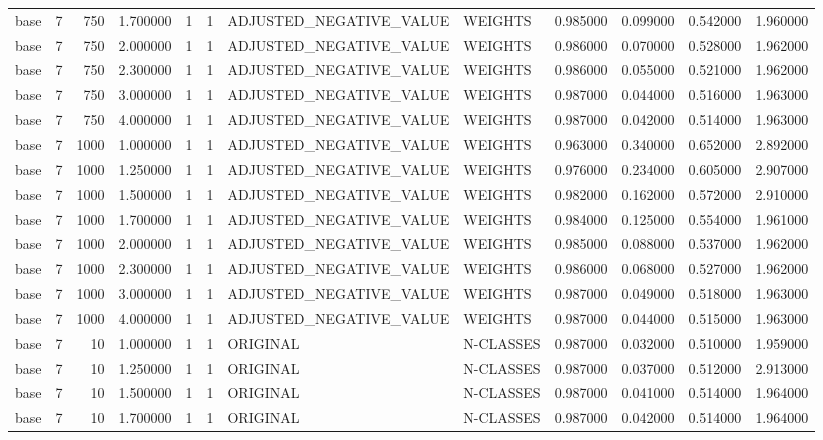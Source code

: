 \begin{tabular}{lrrrllllrrrr}
base & 7 & 750 & 1.700000 & 1 & 1 & ADJUSTED_NEGATIVE_VALUE & WEIGHTS & 0.985000 & 0.099000 & 0.542000 & 1.960000 \\
base & 7 & 750 & 2.000000 & 1 & 1 & ADJUSTED_NEGATIVE_VALUE & WEIGHTS & 0.986000 & 0.070000 & 0.528000 & 1.962000 \\
base & 7 & 750 & 2.300000 & 1 & 1 & ADJUSTED_NEGATIVE_VALUE & WEIGHTS & 0.986000 & 0.055000 & 0.521000 & 1.962000 \\
base & 7 & 750 & 3.000000 & 1 & 1 & ADJUSTED_NEGATIVE_VALUE & WEIGHTS & 0.987000 & 0.044000 & 0.516000 & 1.963000 \\
base & 7 & 750 & 4.000000 & 1 & 1 & ADJUSTED_NEGATIVE_VALUE & WEIGHTS & 0.987000 & 0.042000 & 0.514000 & 1.963000 \\
base & 7 & 1000 & 1.000000 & 1 & 1 & ADJUSTED_NEGATIVE_VALUE & WEIGHTS & 0.963000 & 0.340000 & 0.652000 & 2.892000 \\
base & 7 & 1000 & 1.250000 & 1 & 1 & ADJUSTED_NEGATIVE_VALUE & WEIGHTS & 0.976000 & 0.234000 & 0.605000 & 2.907000 \\
base & 7 & 1000 & 1.500000 & 1 & 1 & ADJUSTED_NEGATIVE_VALUE & WEIGHTS & 0.982000 & 0.162000 & 0.572000 & 2.910000 \\
base & 7 & 1000 & 1.700000 & 1 & 1 & ADJUSTED_NEGATIVE_VALUE & WEIGHTS & 0.984000 & 0.125000 & 0.554000 & 1.961000 \\
base & 7 & 1000 & 2.000000 & 1 & 1 & ADJUSTED_NEGATIVE_VALUE & WEIGHTS & 0.985000 & 0.088000 & 0.537000 & 1.962000 \\
base & 7 & 1000 & 2.300000 & 1 & 1 & ADJUSTED_NEGATIVE_VALUE & WEIGHTS & 0.986000 & 0.068000 & 0.527000 & 1.962000 \\
base & 7 & 1000 & 3.000000 & 1 & 1 & ADJUSTED_NEGATIVE_VALUE & WEIGHTS & 0.987000 & 0.049000 & 0.518000 & 1.963000 \\
base & 7 & 1000 & 4.000000 & 1 & 1 & ADJUSTED_NEGATIVE_VALUE & WEIGHTS & 0.987000 & 0.044000 & 0.515000 & 1.963000 \\
base & 7 & 10 & 1.000000 & 1 & 1 & ORIGINAL & N-CLASSES & 0.987000 & 0.032000 & 0.510000 & 1.959000 \\
base & 7 & 10 & 1.250000 & 1 & 1 & ORIGINAL & N-CLASSES & 0.987000 & 0.037000 & 0.512000 & 2.913000 \\
base & 7 & 10 & 1.500000 & 1 & 1 & ORIGINAL & N-CLASSES & 0.987000 & 0.041000 & 0.514000 & 1.964000 \\
base & 7 & 10 & 1.700000 & 1 & 1 & ORIGINAL & N-CLASSES & 0.987000 & 0.042000 & 0.514000 & 1.964000 \\

\end{tabular}
